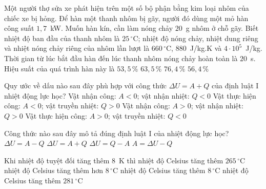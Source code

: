 	\begin{ex}%
		Một người thợ sửa xe phát hiện trên một số bộ phận bằng kim loại nhôm của chiếc xe bị hỏng. Để hàn một thanh nhôm bị gãy, người đó dùng một mỏ hàn công suất $1{,}7$~kW. Muốn hàn kín, cần làm nóng chảy $20$~g nhôm ở chỗ gãy. Biết nhiệt độ ban đầu của thanh nhôm là $25\,^\circ\text{C}$; nhiệt độ nóng chảy, nhiệt dung riêng và nhiệt nóng chảy riêng của nhôm lần lượt là $660\,^\circ\text{C}$, $880$~J/kg.K và $4\cdot 10^5$~J/kg. Thời gian từ lúc bắt đầu hàn đến lúc thanh nhôm nóng chảy hoàn toàn là $20$~s. Hiệu suất của quá trình hàn này là
		\choice
		{$53{,}5\,\%$}
		{$63{,}5\,\%$}
		{$76{,}4\,\%$}
		{\True $56{,}4\,\%$}
	\end{ex}

	\begin{ex}%
		Quy ước về dấu nào sau đây phù hợp với công thức $\Delta U=A+Q$ của định luật I nhiệt động lực học?
		\choice
		{Vật nhận công: $A<0$; vật nhận nhiệt: $Q<0$}
		{Vật thực hiện công: $A<0$; vật truyền nhiệt: $Q>0$}
		{\True Vật nhận công: $A>0$; vật nhận nhiệt: $Q>0$}
		{Vật thực hiện công: $A>0$; vật truyền nhiệt: $Q<0$}
	\end{ex}

	\begin{ex}%
		Công thức nào sau đây mô tả đúng định luật I của nhiệt động lực học?
		\choice
		{$\Delta U=A-Q$}
		{\True $\Delta U=A+Q$}
		{$\Delta U=Q-A$}
		{$A=\Delta U-Q$}
	\end{ex}

	\begin{ex}%
		Khi nhiệt độ tuyệt đối tăng thêm $8$~K thì
		\choice
		{nhiệt độ Celsius tăng thêm $265\,^\circ\text{C}$}
		{nhiệt độ Celsius tăng thêm hơn $8\,^\circ\text{C}$}
		{\True nhiệt độ Celsius tăng thêm $8\,^\circ\text{C}$}
		{nhiệt độ Celsius tăng thêm $281\,^\circ\text{C}$}
	\end{ex}

